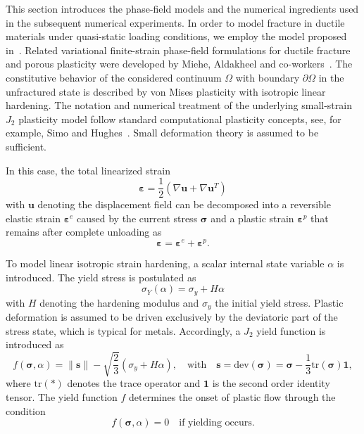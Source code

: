 \documentclass[pdflatex,sn-mathphys-num]{sn-jnl}%
\theoremstyle{thmstyleone}%
\theoremstyle{thmstyletwo}%
\theoremstyle{thmstylethree}%
\begin{document}
This section introduces the phase-field models and the numerical ingredients used in the subsequent numerical experiments.
In order to model fracture in ductile materials under quasi-static loading conditions, we employ the model proposed in~\cite{noll_3d_2020}. 
Related variational finite-strain phase-field formulations for ductile fracture and porous plasticity were developed by Miehe, Aldakheel and co-workers~\cite{miehe_phasefield_ductile_2016,miehe_phasefield_porous_2016,miehe_phasefield_implementation_2017}.
The constitutive behavior of the considered continuum $\Omega$ with boundary $\partial\Omega$ in the unfractured state is described by von Mises plasticity with isotropic linear hardening. 
The notation and numerical treatment of the underlying small-strain $J_2$ plasticity model follow standard computational plasticity concepts, see, for example, Simo and Hughes~\cite{simo_computational_1998}.
Small deformation theory is assumed to be sufficient.

In this case, the total linearized strain
\begin{equation}
    \boldsymbol{\varepsilon} = \dfrac{1}{2}\left(\nabla{\boldsymbol{u}} + \nabla{\boldsymbol{u}}^T\right)
\end{equation}
with $\boldsymbol{u}$ denoting the displacement field can be decomposed into a reversible elastic strain $\boldsymbol{\varepsilon}^e$ caused by the current stress $\boldsymbol{\sigma}$ and a plastic strain $\boldsymbol{\varepsilon}^p$ that remains after complete unloading as
\begin{equation}
  \boldsymbol{\varepsilon} =  \boldsymbol{\varepsilon}^e + \boldsymbol{\varepsilon}^p.
\end{equation}

To model linear isotropic strain hardening, a scalar internal state variable $\alpha$ is introduced. 
The yield stress is postulated as
\begin{equation}
    \sigma_Y(\alpha) = \sigma_y + H\alpha
\end{equation}
with $H$ denoting the hardening modulus and $\sigma_y$ the initial yield stress. 
Plastic deformation is assumed to be driven exclusively by the deviatoric part of the stress state, which is typical for metals. 
Accordingly, a $J_2$ yield function is introduced as
\begin{equation}
    f(\boldsymbol{\sigma},\alpha) = \|\boldsymbol{s}\| - \sqrt{\dfrac{2}{3}}\left(\sigma_y+H\alpha\right), 
    \quad \text{with} \quad 
    \boldsymbol{s} = \text{dev}\left(\boldsymbol{\sigma}\right) = \boldsymbol{\sigma}-\dfrac{1}{3}\text{tr}\left(\boldsymbol{\sigma}\right)\boldsymbol{1},
\end{equation}
where $\text{tr}(*)$ denotes the trace operator and $\boldsymbol{1}$ is the second order identity tensor.
The yield function $f$ determines the onset of plastic flow through the condition
\begin{equation}
    f(\boldsymbol{\sigma},\alpha) = 0 \quad \text{if yielding occurs}.
\end{equation}
\end{document}
